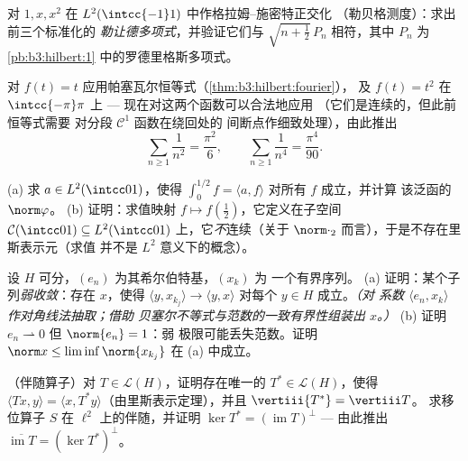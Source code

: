 \begin{exercise}[$\star\star$]\label{exo:b3:hilbert:4}
对 $1, x, x^2$ 在 $L^2(\intcc{-1}1)$ 中作格拉姆–施密特正交化
（勒贝格测度）：求出前三个标准化的
\emph{勒让德多项式}，并验证它们与
$\sqrt{n + \frac12}\,P_n$ 相符，其中 $P_n$ 为
\cref{pb:b3:hilbert:1} 中的罗德里格斯多项式。
\end{exercise}

\begin{exercise}[$\star\star$]\label{exo:b3:hilbert:5}
对 $f(t) = t$ 应用帕塞瓦尔恒等式（\cref{thm:b3:hilbert:fourier}），
及 $f(t) = t^2$ 在 $\intcc{-\pi}\pi$ 上 --- 现在对这两个函数可以合法地应用
（它们是连续的，但此前恒等式需要
对分段 $\mathcal C^1$ 函数在绕回处的
间断点作细致处理），由此推出
\[
\sum_{n\geq1}\frac1{n^2} = \frac{\pi^2}6,
\qquad
\sum_{n\geq1}\frac1{n^4} = \frac{\pi^4}{90} .
\]
\end{exercise}

\begin{exercise}[$\star\star$]\label{exo:b3:hilbert:6}
(a) 求 $a \in L^2(\intcc01)$，使得 $\int_0^{1/2}f =
\langle a, f\rangle$ 对所有 $f$ 成立，并计算
该泛函的 $\norm\varphi$。
(b) 证明：求值映射 $f \mapsto f(\frac12)$，它定义在子空间
$\mathcal C(\intcc01) \subseteq
L^2(\intcc01)$ 上，它\emph{不}连续（关于
$\norm\cdot_2$ 而言），于是不存在里斯表示元（求值
并不是 $L^2$ 意义下的概念）。
\end{exercise}

\begin{exercise}[$\star\star\star$]\label{exo:b3:hilbert:7}
设 $H$ 可分，$(e_n)$ 为其希尔伯特基，$(x_k)$ 为
一个有界序列。
(a) 证明：某个子列\emph{弱收敛}：存在
$x$，使得 $\langle y, x_{k_j}\rangle \to \langle y,
x\rangle$ 对每个 $y \in H$ 成立。\emph{（对
系数 $\langle e_n, x_k\rangle$ 作对角线法抽取；借助
贝塞尔不等式与范数的一致有界性组装出 $x$。）}
(b) 证明 $e_n \rightharpoonup 0$ 但 $\norm{e_n} = 1$：弱
极限可能丢失范数。证明 $\norm x \leq
\liminf\norm{x_{k_j}}$ 在 (a) 中成立。
\end{exercise}

\begin{exercise}[$\star\star$]\label{exo:b3:hilbert:8}
（伴随算子）对 $T \in \mathcal L(H)$，证明存在唯一的
$T^* \in \mathcal L(H)$，使得 $\langle Tx, y\rangle = \langle
x, T^*y\rangle$（由里斯表示定理），并且 $\vertiii{T^*} = \vertiii T$。
求移位算子 $S$ 在 $\ell^2$ 上的伴随，并证明
$\ker T^* = (\operatorname{im}T)^\perp$ --- 由此推出
$\overline{\operatorname{im}T} = (\ker T^*)^\perp$。
\end{exercise}

